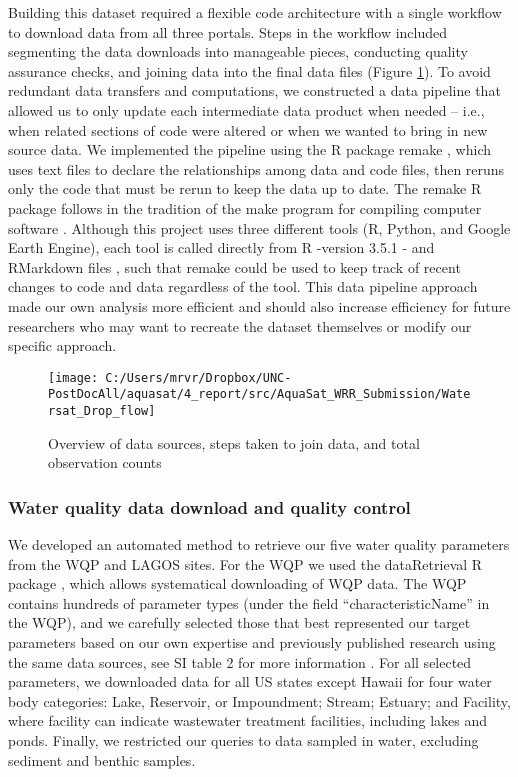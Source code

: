 \documentclass[draft,linenumbers]{agujournal2018}
\begin{document}
Building this dataset required a flexible code architecture with a
single workflow to download data from all three portals. Steps in the
workflow included segmenting the data downloads into manageable pieces,
conducting quality assurance checks, and joining data into the final
data files (Figure \ref{fig:fig1}). To avoid redundant data transfers
and computations, we constructed a data pipeline that allowed us to only
update each intermediate data product when needed -- i.e., when related
sections of code were altered or when we wanted to bring in new source
data. We implemented the pipeline using the R package remake
\citep{FitzJohn2018}, which uses text files to declare the relationships
among data and code files, then reruns only the code that must be rerun
to keep the data up to date. The remake R package follows in the
tradition of the make program for compiling computer software
\citep{Feldman1979}. Although this project uses three different tools
(R, Python, and Google Earth Engine), each tool is called directly from
R -version 3.5.1 \citep{RFoundationforStatisticalComputing2018}- and
RMarkdown files \citep{Allaire2018}, such that remake could be used to
keep track of recent changes to code and data regardless of the tool.
This data pipeline approach made our own analysis more efficient and
should also increase efficiency for future researchers who may want to
recreate the dataset themselves or modify our specific approach.

\begin{figure}[h]
\texttt{[image: C:/Users/mrvr/Dropbox/UNC-PostDocAll/aquasat/4\_report/src/AquaSat\_WRR\_Submission/Watersat\_Drop\_flow]} \caption{Overview of data sources, steps taken to join data, and total observation counts}\label{fig:fig1}
\end{figure}

\subsubsection{Water quality data download and quality control}

We developed an automated method to retrieve our five water quality
parameters from the WQP and LAGOS sites. For the WQP we used the
dataRetrieval R package \citep{Hirsch2015}, which allows systematical
downloading of WQP data. The WQP contains hundreds of parameter types
(under the field ``characteristicName'' in the WQP), and we carefully
selected those that best represented our target parameters based on our
own expertise and previously published research using the same data
sources, see SI table 2 for more information
\citep{Butman2016,Stets2012}. For all selected parameters, we downloaded
data for all US states except Hawaii for four water body categories:
Lake, Reservoir, or Impoundment; Stream; Estuary; and Facility, where
facility can indicate wastewater treatment facilities, including lakes
and ponds. Finally, we restricted our queries to data sampled in water,
excluding sediment and benthic samples.
\end{document}
